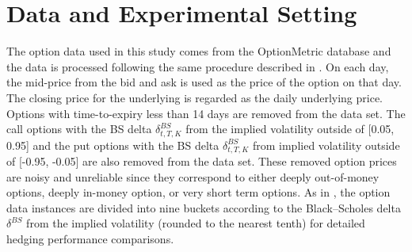 \documentclass[letterpaper,12pt,titlepage,oneside,final]{book}
\numberwithin{equation}{section}
\theoremstyle{definition}
\begin{document}
\section{Data and Experimental Setting}
The option data used in this study comes from the OptionMetric database  and the data is processed following the same procedure described in \cite{hulloptimal}.
On each day, the mid-price from the bid and ask is used as the price of the option on that day. The closing price for the underlying is regarded as the daily underlying price.
Options with time-to-expiry less than 14 days are removed from the data set.  The call options  with the  BS delta $\delta^{BS}_{t,T,K}$ from the implied volatility outside of  [0.05, 0.95]  and the put options with the  BS delta $\delta^{BS}_{t,T,K}$ from implied volatility outside of [-0.95, -0.05] are also removed from the data set. These removed option prices are noisy and unreliable since they correspond to either deeply out-of-money options, deeply in-money option, or very short term options.
As in \cite{hulloptimal},  the option data instances are divided into nine buckets according to the Black–Scholes delta $\delta^{BS}$ from the implied volatility (rounded to the nearest tenth) for  detailed hedging performance comparisons.
\end{document}
